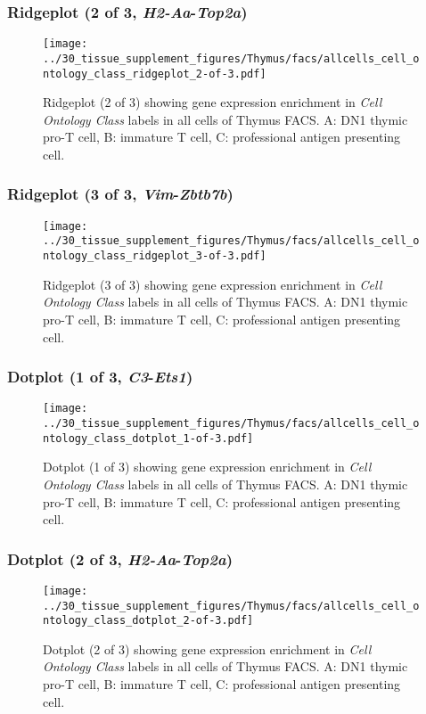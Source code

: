 \clearpage

\subsubsection{Ridgeplot (2 of 3, \emph{H2-Aa}-\emph{Top2a})}
\begin{figure}[h]
\centering
\texttt{[image: ../30\_tissue\_supplement\_figures/Thymus/facs/allcells\_cell\_ontology\_class\_ridgeplot\_2-of-3.pdf]}

\caption{ Ridgeplot (2 of 3)  showing gene expression enrichment in \emph{Cell Ontology Class} labels in all cells of Thymus FACS. A: DN1 thymic pro-T cell, B: immature T cell, C: professional antigen presenting cell.}
\end{figure}


\clearpage

\subsubsection{Ridgeplot (3 of 3, \emph{Vim}-\emph{Zbtb7b})}
\begin{figure}[h]
\centering
\texttt{[image: ../30\_tissue\_supplement\_figures/Thymus/facs/allcells\_cell\_ontology\_class\_ridgeplot\_3-of-3.pdf]}

\caption{ Ridgeplot (3 of 3)  showing gene expression enrichment in \emph{Cell Ontology Class} labels in all cells of Thymus FACS. A: DN1 thymic pro-T cell, B: immature T cell, C: professional antigen presenting cell.}
\end{figure}


\clearpage

\subsubsection{Dotplot (1 of 3, \emph{C3}-\emph{Ets1})}
\begin{figure}[h]
\centering
\texttt{[image: ../30\_tissue\_supplement\_figures/Thymus/facs/allcells\_cell\_ontology\_class\_dotplot\_1-of-3.pdf]}

\caption{ Dotplot (1 of 3)  showing gene expression enrichment in \emph{Cell Ontology Class} labels in all cells of Thymus FACS. A: DN1 thymic pro-T cell, B: immature T cell, C: professional antigen presenting cell.}
\end{figure}


\clearpage

\subsubsection{Dotplot (2 of 3, \emph{H2-Aa}-\emph{Top2a})}
\begin{figure}[h]
\centering
\texttt{[image: ../30\_tissue\_supplement\_figures/Thymus/facs/allcells\_cell\_ontology\_class\_dotplot\_2-of-3.pdf]}

\caption{ Dotplot (2 of 3)  showing gene expression enrichment in \emph{Cell Ontology Class} labels in all cells of Thymus FACS. A: DN1 thymic pro-T cell, B: immature T cell, C: professional antigen presenting cell.}
\end{figure}


